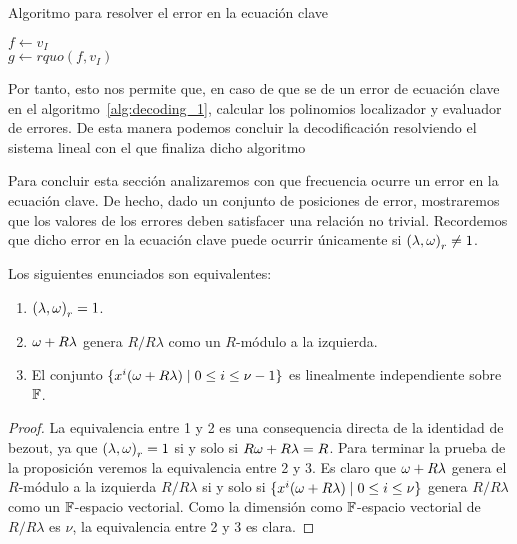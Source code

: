 \begin{algorithm}[H]
 \label{alg:failure_solver}
 \caption{Algoritmo para resolver el error en la ecuación clave}
 \(f \gets v_I\)\\
\(g \gets rquo(f, v_I)\)\\
\end{algorithm}

Por tanto, esto nos permite que, en caso de que se de un error de ecuación clave en el algoritmo~\ref{alg:decoding_1}, calcular los polinomios localizador y evaluador de errores. De esta manera podemos concluir la decodificación resolviendo el sistema lineal con el que finaliza dicho algoritmo

Para concluir esta sección analizaremos con que frecuencia ocurre un error en la ecuación clave. De hecho, dado un conjunto de posiciones de error, mostraremos que los valores de los errores deben satisfacer una relación no trivial. Recordemos que dicho error en la ecuación clave puede ocurrir únicamente si \({(\lambda, \omega)}_r \neq 1\).

\begin{proposition}
    Los siguientes enunciados son equivalentes:
    \begin{enumerate}
        \item \({(\lambda, \omega)}_r = 1\).
        \item \(\omega + R\lambda\) genera  \(R / R\lambda\) como un \(R\)-módulo a la izquierda.
        \item El conjunto \( \{x^{i}(\omega + R\lambda)  \mid 0 \le i \le \nu -1\}\) es linealmente independiente sobre \(\mathbb{F}\).
    \end{enumerate}
\end{proposition}
\begin{proof}
    La equivalencia entre 1 y 2 es una consequencia directa de la identidad de bezout, ya que \({(\lambda, \omega)}_r = 1\) si y solo si \(R\omega + R\lambda = R\). Para terminar la prueba de la proposición veremos la equivalencia entre 2 y 3. Es claro que \(\omega + R\lambda\) genera el \(R\)-módulo a la izquierda \(R / R\lambda\) si y solo si  \( \{x^{i}(\omega + R\lambda)  \mid 0 \le i \le \nu\} \) genera \(R / R\lambda\) como un  \(\mathbb{F}\)-espacio vectorial. Como la dimensión como \(\mathbb{F}\)-espacio vectorial de \(R / R\lambda\) es \(\nu\), la equivalencia entre 2 y 3 es clara.
\end{proof}

